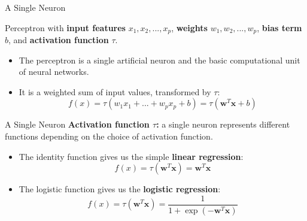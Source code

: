 \begin{vbframe} {A Single Neuron}
\vspace{-0.6cm}
\begin{figure}
\centering
{}
\end{figure}
\vspace{-1.8cm}
\footnotesize Perceptron %
with \textbf{input features} $x_1, x_2, ... ,x_p$, \textbf{weights} $w_1, w_2,... ,w_p$, \textbf{bias term} $b$, and \textbf{activation function} $\tau$.
\vspace{.2cm}
\normalsize
\begin{itemize}
\item The perceptron is a single artificial neuron and the basic computational unit of neural networks.
\vspace{.2cm}
\item It is a weighted sum of input values, transformed by $\tau$:
\vspace{-1mm}
$$f(x) = \tau(w_1x_1 + ... + w_px_p +  b) = \tau(\mathbf{w}^T \mathbf{x}+b)$$
\end{itemize}
\end{vbframe}

\begin{vbframe}{A Single Neuron}
\textbf{Activation function $\tau$:} a single neuron %
 represents different functions %
 depending on the choice of activation function.
\vspace{.5cm}
\begin{itemize}
\item The identity function gives us the simple \textbf{linear regression}:
$$f(x) = \tau(\mathbf{w}^T \mathbf{x}) = \mathbf{w}^T \mathbf{x}$$
\item The logistic function gives us the \textbf{logistic regression}:
$$f(x) = \tau(\mathbf{w}^T \mathbf{x}) = \frac{1}{1 + \exp(-\mathbf{w}^T \mathbf{x})}$$
\end{itemize}
\end{vbframe}


